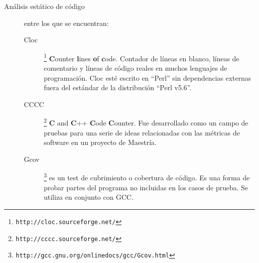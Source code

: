 \begin{description}
\item [Análisis estático de código] entre los que se encuentran:

\begin{description}
\item [Cloc]\footnote{\texttt{http://cloc.sourceforge.net/}} \textbf{C}ounter \textbf{l}ines \textbf{o}f \textbf{c}ode. Contador de líneas en blanco, líneas de comentario y líneas de código reales en muchos lenguajes de programación. Cloc esté escrito en ``Perl'' sin dependencias externas fuera del estándar de la distribución ``Perl v5.6''.

\item [CCCC]\footnote{\texttt{http://cccc.sourceforge.net/}} \textbf{C} and \textbf{C}++ \textbf{C}ode \textbf{C}ounter. Fue desarrollado como un campo de pruebas para una serie de ideas relacionadas con las métricas de software en un proyecto de Maestría.

\item [Gcov]\footnote{\texttt{http://gcc.gnu.org/onlinedocs/gcc/Gcov.html}} es un test de cubrimiento o cobertura de código. Es una forma de probar partes del programa no incluidas en los casos de prueba. Se utiliza en conjunto con GCC.
\end{description}

\end{description}